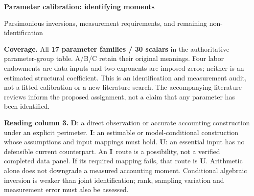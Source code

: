 \documentclass[10pt,a4paper,landscape]{article}
\newcommand{\direct}{\textbf{D}}
\newcommand{\indirect}{\textbf{I}}
\newcommand{\unavail}{\textbf{U}}
\begin{document}
{\LARGE\sffamily\bfseries\color{heading}Parameter calibration: identifying moments}\par
{\large\sffamily Parsimonious inversions, measurement requirements, and remaining non-identification}\par
\textbf{Coverage.} All \textbf{17 parameter families / 30 scalars} in the authoritative parameter-group table. A/B/C retain their original meanings. Four labor endowments are data inputs and two exponents are imposed zeros; neither is an estimated structural coefficient. This is an identification and measurement audit, not a fitted calibration or a new literature search. The accompanying literature reviews inform the proposed assignment, not a claim that any parameter has been identified.

\textbf{Reading column 3.} \direct: a direct observation or accurate accounting construction under an explicit perimeter. \indirect: an estimable or model-conditional construction whose assumptions and input mappings must hold. \unavail: an essential input has no defensible current counterpart. An \indirect\ route is a possibility, not a verified completed data panel. If its required mapping fails, that route is \unavail. Arithmetic alone does not downgrade a measured accounting moment. Conditional algebraic inversion is weaker than joint identification; rank, sampling variation and measurement error must also be assessed.
\end{document}
